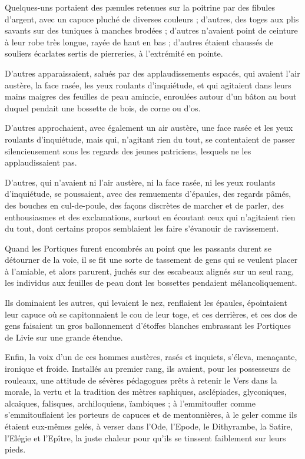 \documentclass[a4paper, 11pt, oneside, polutonikogreek, french]{article}
\begin{document}
Quelques-uns portaient des pænules retenues sur la poitrine par des fibules d'argent, avec un capuce pluché de diverses couleurs ; d'autres, des toges aux plis savants sur des tuniques à manches brodées ; d'autres n'avaient point de ceinture à leur robe très longue, rayée de haut en bas ; d'autres étaient chaussés de souliers écarlates sertis de pierreries, à l'extrémité en pointe.

D'autres apparaissaient, salués par des applaudissements espacés, qui avaient l'air austère, la face rasée, les yeux roulants d'inquiétude, et qui agitaient dans leurs mains maigres des feuilles de peau amincie, enroulées autour d'un bâton au bout duquel pendait une bossette de bois, de corne ou d'os.

D'autres approchaient, avec également un air austère, une face rasée et les yeux roulants d'inquiétude, mais qui, n'agitant rien du tout, se contentaient de passer silencieusement sous les regards des jeunes patriciens, lesquels ne les applaudissaient pas.

D'autres, qui n'avaient ni l'air austère, ni la face rasée, ni les yeux roulants d'inquiétude, se poussaient, avec des remuements d'épaules, des regards pâmés, des bouches en cul-de-poule, des façons discrètes de marcher et de parler, des enthousiasmes et des exclamations, surtout en écoutant ceux qui n'agitaient rien du tout, dont certains propos semblaient les faire s'évanouir de ravissement.

Quand les Portiques furent encombrés au point que les passants durent se détourner de la voie, il se fit une sorte de tassement de gens qui se veulent placer à l'amiable, et alors parurent, juchés sur des escabeaux alignés sur un seul rang, les individus aux feuilles de peau dont les bossettes pendaient mélancoliquement.

Ils dominaient les autres, qui levaient le nez, renflaient les épaules, épointaient leur capuce où se capitonnaient le cou de leur toge, et ces derrières, et ces dos de gens faisaient un gros ballonnement d'étoffes blanches embrassant les Portiques de Livie sur une grande étendue.

Enfin, la voix d'un de ces hommes austères, rasés et inquiets, s'éleva, menaçante, ironique et froide. Installés au premier rang, ils avaient, pour les possesseurs de rouleaux, une attitude de sévères pédagogues prêts à retenir le Vers dans la morale, la vertu et la tradition des mètres saphiques, asclépiades, glyconiques, alcaïques, falisques, archiloquiens, ïambiques ; à l'emmitoufler comme s'emmitouflaient les porteurs de capuces et de mentonnières, à le geler comme ils étaient eux-mêmes gelés, à verser dans l'Ode, l'Epode, le Dithyrambe, la Satire, l'Elégie et l'Epître, la juste chaleur pour qu'ils se tinssent faiblement sur leurs pieds.
\end{document}
